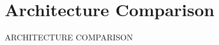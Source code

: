 \documentclass[../NFTComp_IEEE.tex]{subfiles}
\begin{document}
\section{Architecture Comparison}
\label{sec:architecture_comparison}
ARCHITECTURE COMPARISON \cite{Sadia2020}
\end{document}
